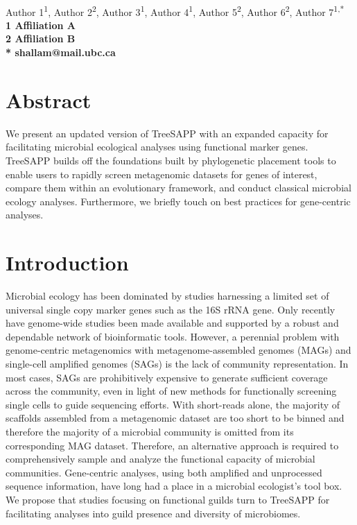 \documentclass[10pt,letterpaper]{article}
\begin{document}
\vspace*{0.35in}

\begin{flushleft}
{\Large
\textbf{}
}
\newline
\\
Author 1\textsuperscript{1},
Author 2\textsuperscript{2},
Author 3\textsuperscript{1},
Author 4\textsuperscript{1},
Author 5\textsuperscript{2},
Author 6\textsuperscript{2},
Author 7\textsuperscript{1,*}
\\
\bigskip
\bf{1} Affiliation A
\\
\bf{2} Affiliation B
\\
\bigskip
* shallam@mail.ubc.ca

\end{flushleft}

\section*{Abstract}
We present an updated version of TreeSAPP with an expanded capacity for facilitating microbial ecological analyses using functional marker genes. TreeSAPP builds off the foundations built by phylogenetic placement tools to enable users to rapidly screen metagenomic datasets for genes of interest, compare them within an evolutionary framework, and conduct classical microbial ecology analyses. Furthermore, we briefly touch on best practices for gene-centric analyses.

\linenumbers

\section*{Introduction}
	Microbial ecology has been dominated by studies harnessing a limited set of universal single copy marker genes such as the 16S rRNA gene. Only recently have genome-wide studies been made available and supported by a robust and dependable network of bioinformatic tools. However, a perennial problem with genome-centric metagenomics with metagenome-assembled genomes (MAGs) and single-cell amplified genomes (SAGs) is the lack of community representation. In most cases, SAGs are prohibitively expensive to generate sufficient coverage across the community, even in light of new methods for functionally screening single cells to guide sequencing efforts. With short-reads alone, the majority of scaffolds assembled from a metagenomic dataset are too short to be binned and therefore the majority of a microbial community is omitted from its corresponding MAG dataset. Therefore, an alternative approach is required to comprehensively sample and analyze the functional capacity of microbial communities.
	Gene-centric analyses, using both amplified and unprocessed sequence information, have long had a place in a microbial ecologist's tool box. We propose that studies focusing on functional guilds turn to TreeSAPP for facilitating analyses into guild presence and diversity of microbiomes.
\end{document}
